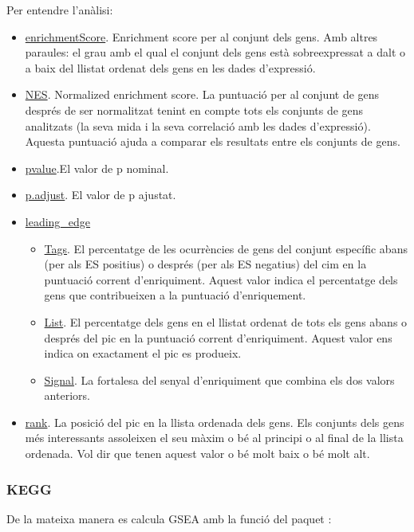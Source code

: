 \documentclass[]{article}
\begin{document}
Per entendre l'anàlisi:



\begin{itemize}
\item \underline{enrichmentScore}. Enrichment score per al conjunt dels gens. Amb altres paraules: el grau amb el qual el conjunt dels gens està sobreexpressat a dalt o a baix del llistat ordenat dels gens en les dades d'expressió.
\item \underline{NES}. Normalized enrichment score. La puntuació per al conjunt de gens després de ser normalitzat tenint en compte tots els conjunts de gens analitzats (la seva mida i la seva correlació amb les dades d'expressió). Aquesta puntuació ajuda a comparar els resultats entre els conjunts de gens.
\item \underline{pvalue}.El valor de p nominal.
\item \underline{p.adjust}. El valor de p ajustat.
\item \underline{leading\_edge}
\begin{itemize}
\item \underline{Tags}. El percentatge de les ocurrències de gens del conjunt específic abans (per als ES positius) o després (per als ES negatius) del cim en la puntuació corrent d'enriquiment. Aquest valor indica el percentatge dels gens que contribueixen a la puntuació d'enriquement. 
\item \underline{List}. El percentatge dels gens en el llistat ordenat de tots els gens abans o després del pic en la puntuació corrent d'enriquiment. Aquest valor ens indica on exactament el pic es produeix. 
\item \underline{Signal}. La fortalesa del senyal d'enriquiment que combina els dos valors anteriors.
\end{itemize}
\item \underline{rank}. La posició del pic en la llista ordenada dels gens. Els conjunts dels gens més interessants assoleixen el seu màxim o bé al principi o al final de la llista ordenada. Vol dir que tenen aquest valor o bé molt baix o bé molt alt.
\end{itemize}

\subsubsection{KEGG}
De la mateixa manera es calcula GSEA amb la funció  del paquet :
\end{document}
